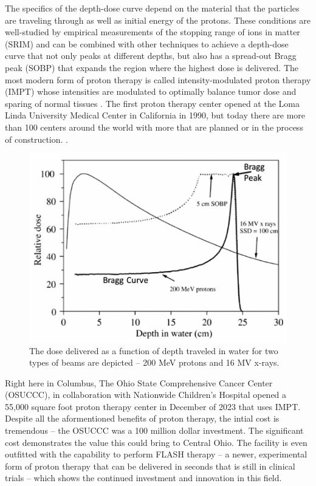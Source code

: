The specifics of the depth-dose curve depend on the material that the particles are traveling through as well as initial energy of the protons. These conditions are well-studied by empirical measurements of the stopping range of ions in matter (SRIM) \cite{Ziegler_2010_SRIM} and can be combined with other techniques to achieve a depth-dose curve that not only peaks at different depths, but also has a spread-out Bragg peak (SOBP) that expands the region where the highest dose is delivered. The most modern form of proton therapy is called intensity-modulated proton therapy (IMPT) whose intensities are modulated to optimally balance tumor dose and sparing of normal tissues \cite{Mohan_2022_PRO}. The first proton therapy center opened at the Loma Linda University Medical Center in California in 1990, but today there are more than 100 centers around the world with more that are planned or in the process of construction. \cite{Mohan_2022_PRO}. 

\begin{figure}
	\centering
	\includegraphics[width=0.75\linewidth]{planning/images/bragg_curve.PNG}
	\caption{The dose delivered as a function of depth traveled in water for two types of beams are depicted -- 200 MeV protons and 16 MV x-rays.}
	\label{fig:bragg_curve}
\end{figure}
 
Right here in Columbus, The Ohio State Comprehensive Cancer Center (OSUCCC), in collaboration with Nationwide Children's Hospital opened a 55,000 square foot proton therapy center in December of 2023 \cite{OSU_CCC} that uses IMPT. Despite all the aformentioned benefits of proton therapy, the intial cost is tremendous -- the OSUCCC was a 100 million dollar investment. The significant cost demonstrates the value this could bring to Central Ohio. The facility is even outfitted with the capability to perform FLASH therapy -- a newer, experimental form of proton therapy that can be delivered in seconds that is still in clinical trials \cite{OSU_CCC} -- which shows the continued investment and innovation in this field. 

